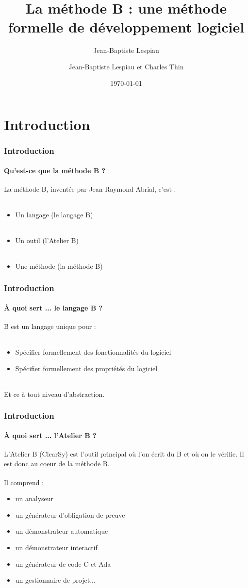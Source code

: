 \documentclass[11pt,a4paper,xcolor=table]{beamer} %
\author[]{Jean-Baptiste Lespiau}
\author{Jean-Baptiste Lespiau et Charles Thin}
\title{La méthode B : une méthode formelle de développement logiciel}
\date\today
\begin{document}
\frame{\titlepage}

\section*{Introduction}

\begin{frame}
\frametitle{Introduction}
\framesubtitle{Qu'est-ce que la méthode B ?}
La méthode B, inventée par Jean-Raymond Abrial, c'est :\\~\\
\begin{itemize}
\pause
\item Un langage (le langage B)\\~\\
\pause
\item Un outil (l'Atelier B)\\~\\
\pause
\item Une méthode (la méthode B)
\end{itemize}
\end{frame}

\begin{frame}
\frametitle{Introduction}
\framesubtitle{À quoi sert ... le langage B ?}
B est un langage unique pour :\\~\\
\pause
\begin{itemize}
\item Spécifier formellement des fonctionnalités du logiciel
\pause
\item Spécifier formellement des propriétés du logiciel
\pause
\end{itemize}
~\\
Et ce à tout niveau d'abstraction.
\end{frame}

\begin{frame}
\frametitle{Introduction}
\framesubtitle{À quoi sert ... l'Atelier B ?}
L'Atelier B (ClearSy) est l'outil principal où l'on écrit du B et où on le vérifie. Il est donc au coeur de la méthode B.\\~\\
\pause
Il comprend :
\begin{itemize}
\item un analyseur
\pause
\item un générateur d'obligation de preuve
\pause
\item un démonstrateur automatique
\pause
\item un démonstrateur interactif
\pause
\item un générateur de code C et Ada
\pause
\item un gestionnaire de projet...
\end{itemize}
\end{frame}
\end{document}
